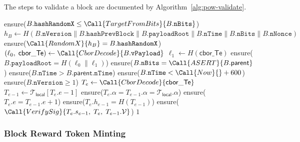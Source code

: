 The steps to validate a block are documented by Algorithm~\ref{alg:pow-validate}.

\begin{algorithm}[!htbp]
  \caption{PoW Block Validation}\label{alg:pow-validate}
  \begin{algorithmic}[0]
      \State {}
      \State ensure($B.\texttt{hashRandomX} \le \Call{TargetFromBits}{B.\texttt{nBits}}$)
      \State
      \State {}
      \State $h_B \gets H(B.\texttt{nVersion} \| B.\texttt{hashPrevBlock} \| B.\texttt{payloadRoot} \| B.\texttt{nTime} \| B.\texttt{nBits} \| B.\texttt{nNonce})$
      \State ensure($\Call{RandomX}{h_B} = B.\texttt{hashRandomX}$)
      \State
      \State {}
      \State $(\ell_0,\; \mathsf{cbor\_Te}) \gets \Call{CborDecode}{B.\texttt{vPayload}}$
      \State $\ell_1 \gets H(\mathsf{cbor\_Te})$
      \State ensure($B.\texttt{payloadRoot} = H(\ell_0 \| \ell_1)$) 
      \State
      \State {}
      \State ensure($B.\texttt{nBits} = \Call{ASERT}{B.\mathsf{parent}}$) 
      \State ensure($B.\texttt{nTime} > B.\mathsf{parent}.\texttt{nTime}$) 
      \State ensure($B.\texttt{nTime} < \Call{Now}{} + 600$) 
      \State ensure($B.\texttt{nVersion} \ge 1$)
      \State
      \State {}
        \State $T_e \gets \Call{CborDecode}{\mathsf{cbor\_Te}}$
        \State $T_{e-1} \gets \mathcal{T}_\mathsf{local}[T_e.e - 1]$ 
        \State ensure($T_e.\alpha = T_{e-1}.\alpha = \mathcal{T}_\mathsf{local}.\alpha$) 
        \State ensure($T_e.e = T_{e-1}.e + 1$) 
        \State ensure($T_e.h_{e-1} = H(T_{e-1})$) 
        \State ensure($\Call{VerifySig}{T_e.s_{e-1},\; T_e,\; T_{e-1}.\mathcal{V}}$) 
      \EndIf
      \State \Return $1$
    \EndFunction
  \end{algorithmic}
\end{algorithm}


\subsubsection{Block Reward Token Minting}\label{sec:pow-reward-minting}

